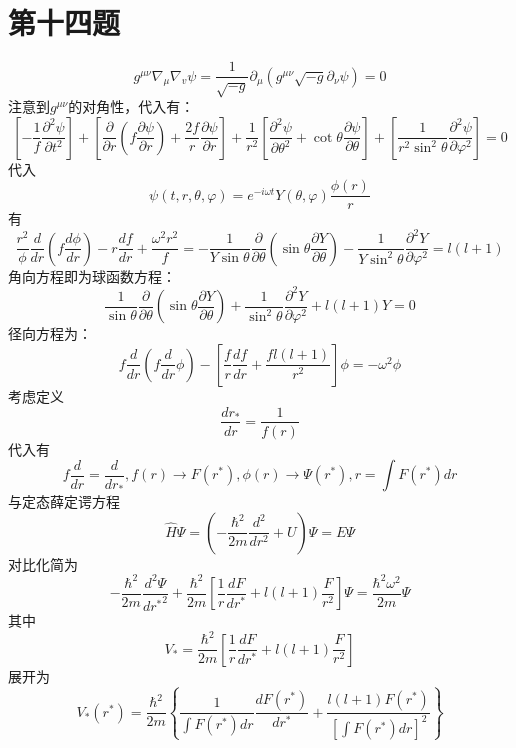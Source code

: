 \documentclass[a4paper]{ctexart}
\begin{document}
\section{第十四题}
$$
g^{\mu \nu}\nabla _{\mu}\nabla _v\psi =\frac{1}{\sqrt{-g}}\partial _{\mu}\left( g^{\mu \nu}\sqrt{-g}\partial _{\nu}\psi \right) =0
$$
注意到$g^{\mu \nu}$的对角性，代入有：
$$
\left[ -\frac{1}{f}\frac{\partial ^2\psi}{\partial t^2} \right] +\left[ \frac{\partial}{\partial r}\left( f\frac{\partial \psi}{\partial r} \right) +\frac{2f}{r}\frac{\partial \psi}{\partial r} \right] +\frac{1}{r^2}\left[ \frac{\partial ^2\psi}{\partial \theta ^2}+\cot \theta \frac{\partial \psi}{\partial \theta} \right] +\left[ \frac{1}{r^2\sin ^2\theta}\frac{\partial ^2\psi}{\partial \varphi ^2} \right] =0
$$
代入
$$
\psi \left( t,r,\theta ,\varphi \right) =e^{-i\omega t}Y\left( \theta ,\varphi \right) \frac{\phi \left( r \right)}{r}
$$
有
$$
\frac{r^2}{\phi}\frac{d}{dr}\left( f\frac{d\phi}{dr} \right) -r\frac{df}{dr}+\frac{\omega ^2r^2}{f}=-\frac{1}{Y\sin \theta}\frac{\partial}{\partial \theta}\left( \sin \theta \frac{\partial Y}{\partial \theta} \right) -\frac{1}{Y\sin ^2\theta}\frac{\partial ^2Y}{\partial \varphi ^2}=l\left( l+1 \right) 
$$
角向方程即为球函数方程：
$$
\frac{1}{\sin \theta}\frac{\partial}{\partial \theta}\left( \sin \theta \frac{\partial Y}{\partial \theta} \right) +\frac{1}{\sin ^2\theta}\frac{\partial ^2Y}{\partial \varphi ^2}+l\left( l+1 \right) Y=0
$$
径向方程为：
$$
f\frac{d}{dr}\left( f\frac{d}{dr}\phi \right) -\left[ \frac{f}{r}\frac{df}{dr}+\frac{fl\left( l+1 \right)}{r^2} \right] \phi =-\omega ^2\phi 
$$
考虑定义
$$
\frac{dr_*}{dr}=\frac{1}{f\left( r \right)}
$$
代入有
$$
f\frac{d}{dr}=\frac{d}{dr_*},f\left( r \right) \rightarrow F\left( r^* \right) ,\phi \left( r \right) \rightarrow \Psi \left( r^* \right) ,r=\int{F\left( r^* \right) dr}
$$
与定态薛定谔方程
$$
\hat{H}\Psi =\left( -\frac{\hbar^2}{2m}\frac{d^2}{dr^2}+U \right) \Psi =E\Psi 
$$
对比化简为
$$
-\frac{\hbar^2}{2m}\frac{d^2\Psi}{{dr^*}^2}+\frac{\hbar^2}{2m}\left[ \frac{1}{r}\frac{dF}{dr^*}+l\left( l+1 \right) \frac{F}{r^2} \right] \Psi =\frac{\hbar^2\omega ^2}{2m}\Psi 
$$
其中
$$
V_*=\frac{\hbar^2}{2m}\left[ \frac{1}{r}\frac{dF}{dr^*}+l\left( l+1 \right) \frac{F}{r^2} \right] 
$$
展开为
$$
V_*\left( r^* \right) =\frac{\hbar^2}{2m}\left\{ \frac{1}{\int{F\left( r^* \right) dr}}\frac{dF\left( r^* \right)}{dr^*}+\frac{l\left( l+1 \right) F\left( r^* \right)}{\left[ \int{F\left( r^* \right) dr} \right] ^2} \right\} 
$$
\end{document}
